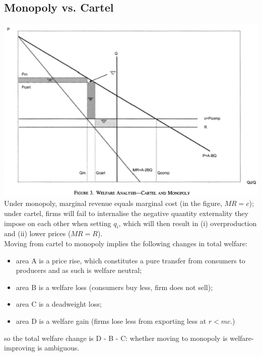 \documentclass[11pt]{article}
\numberwithin{equation}{section}
\begin{document}
\subsection{Monopoly vs. Cartel}

{\centering\includegraphics[scale=0.8]{l1_p1}} \\

 Under monopoly, marginal revenue equals marginal cost (in the figure, $MR = c$); under cartel, firms will fail to internalise the negative quantity externality they impose on each other when setting $q_i$, which will then result in (i) overproduction and (ii) lower prices ($MR = R$). \\
 Moving from cartel to monopoly implies the following changes in total welfare:
 \begin{itemize}
 	\item area A is a price rise, which constitutes a pure transfer from consumers to producers and as such is welfare neutral;
 	\item area B is a welfare loss (consumers buy less, firm does not sell);
 	\item area C is a deadweight loss;
 	\item area D is a welfare gain (firms lose less from exporting less at $r < mc$.)
 \end{itemize}
 so the total welfare change is D - B - C: whether moving to monopoly is welfare-improving is ambiguous.
\end{document}
